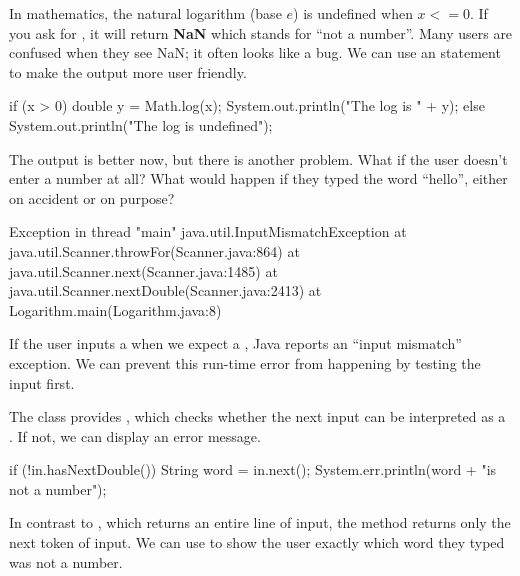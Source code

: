 In mathematics, the natural logarithm (base $e$) is undefined when $x <= 0$.
If you ask for , it will return {\bf NaN} which stands for ``not a number''.
Many users are confused when they see NaN; it often looks like a bug.
We can use an  statement to make the output more user friendly.

\begin{code}
if (x > 0) {
    double y = Math.log(x);
    System.out.println("The log is " + y);
} else {
    System.out.println("The log is undefined");
}
\end{code}

The output is better now, but there is another problem.
What if the user doesn't enter a number at all?
What would happen if they typed the word ``hello'', either on accident or on purpose?


\begin{small}
\begin{stdout}
Exception in thread "main" java.util.InputMismatchException
    at java.util.Scanner.throwFor(Scanner.java:864)
    at java.util.Scanner.next(Scanner.java:1485)
    at java.util.Scanner.nextDouble(Scanner.java:2413)
    at Logarithm.main(Logarithm.java:8)
\end{stdout}
\end{small}


If the user inputs a  when we expect a , Java reports an ``input mismatch'' exception.
We can prevent this run-time error from happening by testing the input first.

The  class provides , which checks whether the next input can be interpreted as a .
If not, we can display an error message.

\begin{code}
if (!in.hasNextDouble()) {
    String word = in.next();
    System.err.println(word + "is not a number");
}
\end{code}


In contrast to , which returns an entire line of input, the  method returns only the next token of input.
We can use  to show the user exactly which word they typed was not a number.


